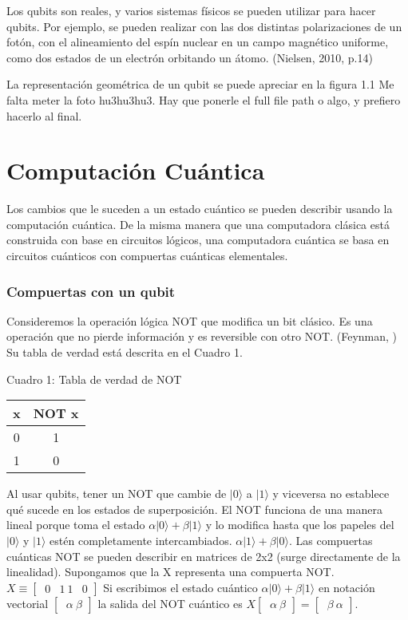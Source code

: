 \documentclass[11pt,a4paper]{article}
\begin{document}
Los qubits son reales, y varios sistemas físicos se pueden utilizar para hacer qubits. Por ejemplo, se pueden realizar con las dos distintas polarizaciones de un fotón, con el alineamiento del espín nuclear en un campo magnético uniforme, como dos estados de un electrón orbitando un átomo. (Nielsen, 2010, p.14) 

La representación geométrica de un qubit se puede apreciar en la figura 1.1
Me falta meter la foto hu3hu3hu3. Hay que ponerle el full file path o algo,  y prefiero hacerlo al final. 

\part{Computación Cuántica}
Los cambios que le suceden a un estado cuántico se pueden describir usando la computación cuántica. De la misma manera que una computadora clásica está construida con base en circuitos lógicos, una computadora cuántica se basa en circuitos cuánticos con compuertas cuánticas elementales.
 
\section*{Compuertas con un qubit}
Consideremos la operación lógica NOT que modifica un bit clásico. Es una operación que no pierde información y es reversible con otro NOT. (Feynman, )
Su tabla de verdad está descrita en el Cuadro 1.

Cuadro 1: Tabla de verdad de NOT
\begin{center}
    \begin{tabular}{ c | c }
    x & NOT x \\ 
	\hline
    0 & 1\\ 
    1 & 0 \\ 
    \end{tabular}
\end{center}

Al usar qubits, tener un NOT que cambie de $\vert 0\rangle$ a $\vert 1\rangle$ y viceversa no establece qué sucede en los estados de superposición. 
El NOT funciona de una manera lineal porque toma el estado 
 $\alpha \vert 0\rangle + \beta \vert 1\rangle$
 y lo modifica hasta que los papeles del $\vert 0\rangle$ y $\vert 1\rangle$ estén completamente intercambiados. 
  $\alpha \vert 1\rangle + \beta \vert 0\rangle$. 
Las compuertas cuánticas NOT se pueden describir en matrices de 2x2 (surge directamente de la linealidad). Supongamos que la X representa una compuerta NOT. 
$X \equiv \begin{bmatrix}
		\ 0 & 1
		\ 1 & 0
	      \end{bmatrix}$
Si escribimos el estado cuántico $\alpha \vert 0\rangle + \beta \vert 1\rangle$ en notación vectorial
$
\begin{bmatrix}
 \ \alpha
 \ \beta
 \end{bmatrix}
$
la salida del NOT cuántico es 
$X \begin{bmatrix} 
     \ \alpha
     \ \beta
 \end{bmatrix}
 = \begin{bmatrix}
 \ \beta
 \ \alpha
 \end{bmatrix}$.
 
\end{document}
